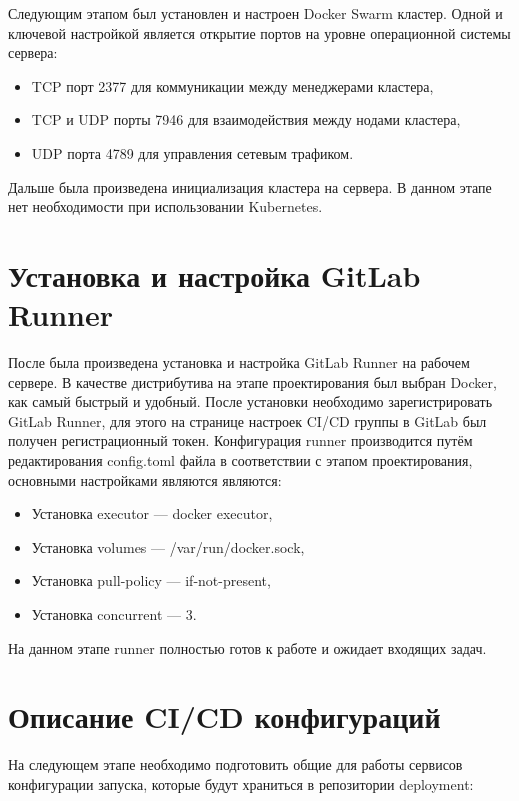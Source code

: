 Следующим этапом был установлен и настроен Docker Swarm кластер.
Одной и ключевой настройкой является открытие портов на уровне операционной системы сервера\cite{web:docker:swarm}:

\begin{itemize}
    \item TCP порт 2377 для коммуникации между менеджерами кластера,
    \item TCP и UDP порты 7946 для взаимодействия между нодами кластера,
    \item UDP порта 4789 для управления сетевым трафиком\cite{linuxPocket}.
\end{itemize}

Дальше была произведена инициализация кластера на сервера.
В данном этапе нет необходимости при использовании Kubernetes.

\section{Установка и настройка GitLab Runner}

После была произведена установка и настройка GitLab Runner на рабочем сервере.
В качестве дистрибутива на этапе проектирования был выбран Docker, как самый быстрый и удобный.
После установки необходимо зарегистрировать GitLab Runner, для этого на странице настроек CI/CD группы в GitLab был получен регистрационный токен.
Конфигурация runner производится путём редактирования config.toml\cite{web:gitlab:docs} файла в соответствии с этапом проектирования, основными настройками являются являются:

\begin{itemize}
    \item Установка executor --- docker executor,
    \item Установка volumes --- /var/run/docker.sock\cite{web:docker:docs},
    \item Установка pull-policy --- if-not-present,
    \item Установка concurrent --- 3.
\end{itemize}

На данном этапе runner полностью готов к работе и ожидает входящих задач.

\section{Описание CI/CD конфигураций}

На следующем этапе необходимо подготовить общие для работы сервисов конфигурации запуска, которые будут храниться в репозитории deployment:

